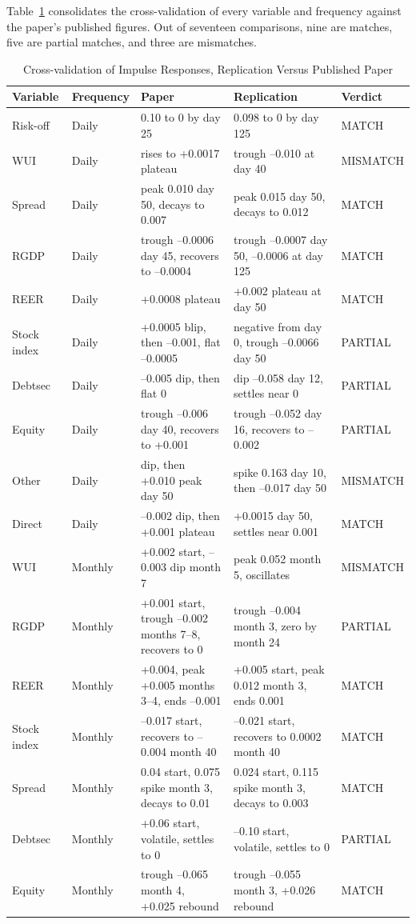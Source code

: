 Table~\ref{tab:crossval} consolidates the cross-validation of every variable and frequency against the paper's published figures. Out of seventeen comparisons, nine are matches, five are partial matches, and three are mismatches.

\begin{table}[H]
  \centering
  \caption{Cross-validation of Impulse Responses, Replication Versus Published Paper}
  \label{tab:crossval}
  \small
  \begin{tabularx}{\textwidth}{@{}l l p{4.6cm} p{4.6cm} l@{}}
    \toprule
    Variable & Frequency & Paper & Replication & Verdict \\
    \midrule
    Risk-off & Daily & 0.10 to 0 by day 25 & 0.098 to 0 by day 125 & MATCH \\
    WUI & Daily & rises to +0.0017 plateau & trough --0.010 at day 40 & MISMATCH \\
    Spread & Daily & peak 0.010 day 50, decays to 0.007 & peak 0.015 day 50, decays to 0.012 & MATCH \\
    RGDP & Daily & trough --0.0006 day 45, recovers to --0.0004 & trough --0.0007 day 50, --0.0006 at day 125 & MATCH \\
    REER & Daily & +0.0008 plateau & +0.002 plateau at day 50 & MATCH \\
    Stock index & Daily & +0.0005 blip, then --0.001, flat --0.0005 & negative from day 0, trough --0.0066 day 50 & PARTIAL \\
    Debtsec & Daily & --0.005 dip, then flat 0 & dip --0.058 day 12, settles near 0 & PARTIAL \\
    Equity & Daily & trough --0.006 day 40, recovers to +0.001 & trough --0.052 day 16, recovers to --0.002 & PARTIAL \\
    Other & Daily & dip, then +0.010 peak day 50 & spike 0.163 day 10, then --0.017 day 50 & MISMATCH \\
    Direct & Daily & --0.002 dip, then +0.001 plateau & +0.0015 day 50, settles near 0.001 & MATCH \\
    WUI & Monthly & +0.002 start, --0.003 dip month 7 & peak 0.052 month 5, oscillates & MISMATCH \\
    RGDP & Monthly & +0.001 start, trough --0.002 months 7--8, recovers to 0 & trough --0.004 month 3, zero by month 24 & PARTIAL \\
    REER & Monthly & +0.004, peak +0.005 months 3--4, ends --0.001 & +0.005 start, peak 0.012 month 3, ends 0.001 & MATCH \\
    Stock index & Monthly & --0.017 start, recovers to --0.004 month 40 & --0.021 start, recovers to 0.0002 month 40 & MATCH \\
    Spread & Monthly & 0.04 start, 0.075 spike month 3, decays to 0.01 & 0.024 start, 0.115 spike month 3, decays to 0.003 & MATCH \\
    Debtsec & Monthly & +0.06 start, volatile, settles to 0 & --0.10 start, volatile, settles to 0 & PARTIAL \\
    Equity & Monthly & trough --0.065 month 4, +0.025 rebound & trough --0.055 month 3, +0.026 rebound & MATCH \\
    \bottomrule
  \end{tabularx}
\end{table}

